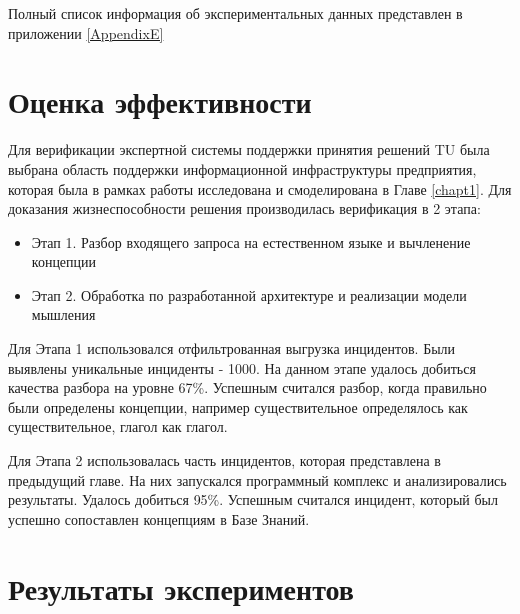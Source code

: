 Полный список информация об экспериментальных данных представлен в приложении \ref{AppendixE}
\clearpage



\section{Оценка эффективности}
Для верификации экспертной системы поддержки принятия решений TU была выбрана область поддержки информационной инфраструктуры предприятия, которая была в рамках работы исследована и смоделирована в Главе \ref{chapt1}. 
Для доказания жизнеспособности решения производилась верификация в 2 этапа:
\begin{itemize}
	\item Этап 1. Разбор входящего запроса на естественном языке и вычленение концепции
	\item Этап 2. Обработка по разработанной архитектуре и реализации модели мышления  
\end{itemize}
Для Этапа 1 использовался отфильтрованная выгрузка инцидентов. Были выявлены уникальные инциденты - 1000. На данном этапе удалось добиться качества разбора на уровне 67\%. Успешным считался разбор, когда правильно были определены концепции, например существительное определялось как существительное, глагол как глагол. \par
Для Этапа 2 использовалась часть инцидентов, которая представлена в предыдущий главе. На них запускался программный комплекс и анализировались результаты. Удалось добиться 95\%. Успешным считался инцидент, который был успешно сопоставлен концепциям в Базе Знаний. \par




\section{Результаты экспериментов}

